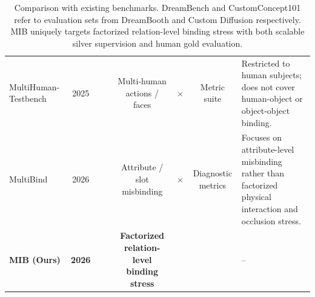\documentclass{article}
\newcommand{\cmark}{\checkmark}
\newcommand{\xmark}{$\times$}
\begin{document}
\begin{table}[H]
{\begin{tabular}{l c c c c c c p{3.2cm}}
MultiHuman-Testbench~\cite{borse2025multihuman}
& 2025
& \cmark
& \cmark
& Multi-human actions / faces
& \xmark
& Metric suite
& Restricted to human subjects; does not cover human-object or object-object binding. \\

MultiBind~\cite{tian2026multibind}
& 2026
& \cmark
& \cmark
& Attribute / slot misbinding
& \xmark
& Diagnostic metrics
& Focuses on attribute-level misbinding rather than factorized physical interaction and occlusion stress. \\

\midrule
\textbf{MIB (Ours)}
& \textbf{2026}
& \cmark
& \cmark
& \textbf{Factorized relation-level binding stress}
& \cmark
& \cmark
& -- \\
\bottomrule
\end{tabular}
}
\vspace{1em}
\caption{Comparison with existing benchmarks. DreamBench and CustomConcept101 refer to evaluation sets from DreamBooth and Custom Diffusion respectively. MIB uniquely targets factorized relation-level binding stress with both scalable silver supervision and human gold evaluation.}
\label{tab:benchmark_comparison}
\end{table}
\end{document}
